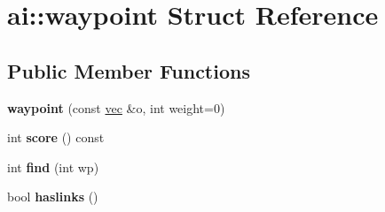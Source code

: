 \hypertarget{structai_1_1waypoint}{}\section{ai\+:\+:waypoint Struct Reference}
\label{structai_1_1waypoint}
\subsection*{Public Member Functions}
\begin{DoxyCompactItemize}
\item 
\mbox{\label{structai_1_1waypoint_a201fda3118197f90d59a653493f1b87b}} 
{\bfseries waypoint} (const \hyperlink{structvec}{vec} \&o, int weight=0)
\item 
\mbox{\label{structai_1_1waypoint_a8b3025dd60c807634d8b747f2735bbd9}} 
int {\bfseries score} () const
\item 
\mbox{\label{structai_1_1waypoint_a0ce5faa177ab2fca707f8717131c23da}} 
int {\bfseries find} (int wp)
\item 
\mbox{\label{structai_1_1waypoint_a5f3ac6a2de8693e8314defdc96bf0057}} 
bool {\bfseries haslinks} ()
\end{DoxyCompactItemize}
